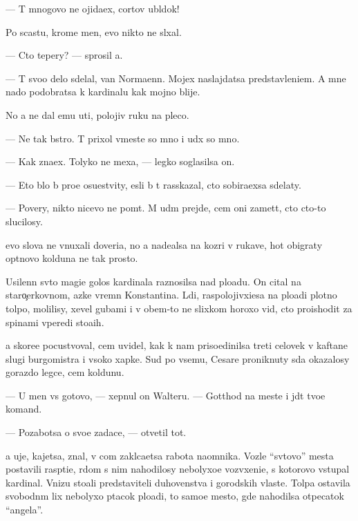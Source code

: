 \documentclass[10pt]{book}
\begin{document}
— T{\yi} mnogovo ne ojida{\y}ex, cortov ubl{\io}\-dok!

Po scast{\y}u, krome men{\ia}, {\y}evo nikto ne sl{\yi}xal.

— Cto tepery? — sprosil {\y}a.

— T{\yi} svo{\y}o delo sdelal, van Normaenn. Mojex naslajdatsa predstavleni{\y}em. A mne nado podobratsa k kardinalu kak mojno blije.

No {\y}a ne dal {\y}emu u{\y}ti, polojiv ruku na pleco.

— Ne tak b{\yi}stro. T{\yi} prixol vmeste so mno{\y} i u{\y}d{\e}x so mno{\y}.

— Kak zna\-{\y}ex. Tolyko ne mexa{\y}, — legko soglasilsa on.

— Eto b{\yi}lo b{\yi} pro{\x}e osu{\x}estvity, {\y}esli b{\yi} t{\yi} rasskazal, cto sobira{\y}exsa sdelaty.

— Povery, nikto nicevo ne po{\y}m{\e}t. M{\yi} u{\y}d{\e}m prejde, cem oni zamet{\ia}t, cto cto-to slucilosy.

{\Y}evo slova ne vnuxali doveri{\y}a, no {\y}a nade{\y}alsa na koz{\yi}ri v rukave, hot{\ia} ob\-igraty op{\yi}tnovo kolduna ne tak prosto.

Usilenn{\yi}{\y} sv{\ia}to{\y} magi{\y}e{\y} golos kardinala raznosilsa nad plo{\x}ad{\y}u. On cital na staro{\c}erkovnom, {\y}az{\yi}ke vrem{\e}n Konstantina. L{\io}di, raspolojivxi{\y}esa na plo{\x}adi plotno{\y} tolpo{\y}, molilisy, xevel{\ia} gubami i v ob{\x}em-to ne slixkom horoxo vid{\ia}, cto proishodit za spinami vperedi sto{\y}a{\x}ih.

{\Y}a skore{\y}e pocustvoval, cem uvidel, kak k nam priso{\y}edinilsa treti{\y} celovek v kaftane slugi burgomistra i v{\yi}soko{\y} xapke. Sud{\ia} po vsemu, Cesare proniknuty s{\io}da okazalosy gorazdo legce, cem koldunu.

— U men{\ia} vs{\e} gotovo, — xepnul on Walteru. — Gotthod na meste i jd{\e}t tvo{\y}e{\y} komand{\yi}.

— Pozabotsa o svo{\y}e{\y} zadace, — otvetil tot.

{\Y}a uje, kajetsa, znal, v com zakl{\io}ca{\y}etsa rabota na\-{\y}om\-ni\-ka. Vozle ``sv{\ia}tovo'' mesta postavili rasp{\ia}ti{\y}e, r{\ia}dom s nim nahodilosy nebolyxo{\y}e vozv{\yi}xeni{\y}e, s kotorovo v{\yi}stupal kardinal. Vnizu sto{\y}ali predstaviteli duhovenstva i gorodskih vlaste{\y}. Tolpa ostavila svobodn{\yi}m lix nebolyxo{\y} p{\ia}tacok plo{\x}adi, to samo{\y}e mesto, gde nahodilsa otpecatok ``angela''.
\end{document}
